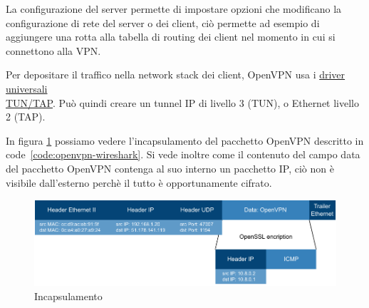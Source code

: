 La configurazione del server permette di impostare opzioni che modificano la configurazione di rete del server o dei client, ciò permette ad esempio di aggiungere una rotta alla tabella di routing dei client nel momento in cui si connettono alla VPN.

Per depositare il traffico nella network stack dei client, OpenVPN usa i \href{https://docs.kernel.org/networking/tuntap.html}{driver universali \\TUN/TAP}. Può quindi creare un tunnel IP di livello 3 (TUN), o Ethernet livello 2 (TAP).

\todo[da rivedere!]

In figura \ref{fig:incapsulamento-openvpn} possiamo vedere l'incapsulamento del pacchetto OpenVPN descritto in code~\ref{code:openvpn-wireshark}. Si vede inoltre come il contenuto del campo data del pacchetto OpenVPN contenga al suo interno un pacchetto IP, ciò non è visibile dall'esterno perchè il tutto è opportunamente cifrato.

\begin{figure}[h]
    \centering
    \includegraphics[width=1\textwidth]{immagini/diag2-incapsulamento_openvpn}
    \caption{Incapsulamento}
    \label{fig:incapsulamento-openvpn}
\end{figure}

